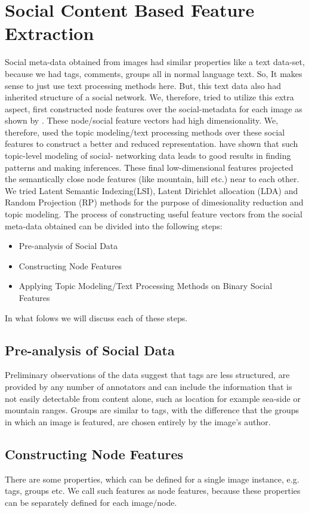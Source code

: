 \section{Social Content Based Feature Extraction}
Social meta-data obtained from images had similar properties like a text data-set, because we had tags, comments, groups all in normal 
language text. So, It makes sense to just use text processing methods here. But, this text data also had inherited 
structure of a social network. We, therefore, tried to utilize this extra 
aspect, first constructed node features over the social-metadata for 
each image as shown by \citet*{Jure}. These node/social feature 
vectors had high dimensionality. We, therefore, used the topic 
modeling/text processing methods over these social features to 
construct a better and reduced representation.  have shown that such topic-level modeling of social-
networking data leads to good results in finding patterns and making 
inferences. These final low-dimensional features projected the 
semantically close node features (like mountain, hill etc.) near to 
each other. We tried Latent Semantic Indexing(LSI), Latent Dirichlet 
allocation (LDA) and Random Projection (RP) methods for the purpose 
of dimesionality reduction and topic modeling. 
The process of constructing useful feature vectors from the social 
meta-data obtained can be divided into the following steps:
\begin{itemize}
\item Pre-analysis of Social Data
\item Constructing Node Features
\item Applying Topic Modeling/Text Processing Methods on Binary Social Features
\end{itemize} 
In what folows we will discuss each of these steps.
\subsection{Pre-analysis of Social Data}
Preliminary  observations of the data suggest that 
tags are less structured, are provided by any number of annotators 
and can include the information that is not easily detectable from 
content alone, such as location for example sea-side or mountain ranges. 
Groups are similar to tags, with the difference that the groups in which 
an image is featured, are chosen entirely by the image's author.

\subsection{Constructing Node Features}
There are some properties, which can be defined for a single image 
instance, e.g. tags, groups etc. We call such features as node 
features, because these properties can be separately defined for 
each image/node. 

